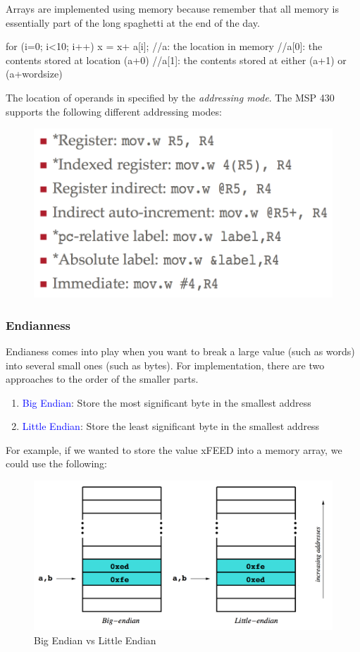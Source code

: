 \documentclass{hw}
\begin{document}
Arrays are implemented using memory because remember that all memory is essentially
part of the long spaghetti at the end of the day. 
\begin{C}
for (i=0; i<10; i++){
  x = x+ a[i];
}
//a:    the location in memory
//a[0]: the contents stored at location (a+0)
//a[1]: the contents stored at either (a+1) or (a+wordsize)
\end{C}

The location of operands in specified by the \emph{addressing mode}. The MSP 430
supports the following different addressing modes:
\begin{figure}[H]
  \includegraphics[scale=.5]{address}
\end{figure}

\subsubsection{Endianness}
Endianess comes into play when you want to break a large value (such as words) 
into several small ones (such as bytes). For implementation, there are two 
approaches to the order of the smaller parts. 
\begin{enumerate}
\item \textcolor{blue}{Big Endian}: Store the most significant byte in the smallest address
\item \textcolor{blue}{Little Endian}: Store the least significant byte in the 
  smallest address
\end{enumerate}
For example, if we wanted to store the value xFEED into a memory array, we could
use the following:
\begin{figure}[H]
  \centering
  \includegraphics[scale=.4]{endian}
  \caption{Big Endian vs Little Endian}
\end{figure}
\end{document}
